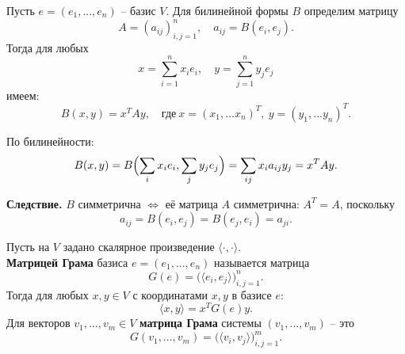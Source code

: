 \documentclass[14pt]{extreport}
\begin{document}
    \begin{thbox}
        Пусть $e = (e_1, ..., e_n)$ – базис $V$. Для билинейной формы $B$ определим матрицу
        \[
        A = (a_{ij})_{i,j=1}^n, \quad a_{ij} = B(e_i, e_j).
        \]
        Тогда для любых
        \[
        x = \sum_{i=1}^n x_ie_i, \quad y = \sum_{j=1}^n y_je_j
        \]
        имеем:
        \[
        B(x,y) = x^TAy, \quad \text{где}\ x = (x_1,...x_n)^T,\ y = (y_1,...y_n)^T.
        \]
    \end{thbox}

    \begin{prbox}
        По билинейности:
        \[
        B(x,y) = B \Bigl( \sum_i x_ie_i, \sum_j y_je_j \Bigr) = \sum_{ij} x_ia_{ij}y_j = x^TAy.
        \]
    \end{prbox}

    \begin{impbox}
        \textbf{Следствие.} $B$ симметрична $\Leftrightarrow$ её матрица $A$ симметрична: $A^T = A$, поскольку
        \[
        a_{ij} = B(e_i,e_j) = B(e_j,e_i) = a_{ji}.
        \]
    \end{impbox}

    \begin{defbox}
        Пусть на $V$ задано скалярное произведение $\langle \cdot,\cdot \rangle$. \\
        \textbf{Матрицей Грама} базиса $e = (e_1,...,e_n)$ называется матрица
        \[
        G(e) = \bigl( \langle e_i,e_j \rangle \bigr) _{i,j=1}^n.
        \]
        Тогда для любых $x,y \in V$ с координатами $x,y$ в базисе $e$:
        \[
        \langle x,y \rangle = x^T G(e) y.
        \]
        Для векторов $v_1,...,v_m \in V$ \textbf{матрица Грама} системы $(v_1,...,v_m)$ – это
        \[
        G(v_1,...,v_m) = \bigl( \langle v_i,v_j \rangle \bigr) _{i,j=1}^m.
        \]
    \end{defbox}
\end{document}
